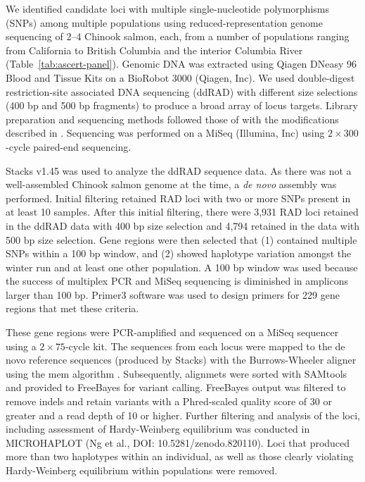 We identified candidate loci with multiple single-nucleotide polymorphisms (SNPs) among multiple
populations using reduced-representation genome sequencing of 2--4 Chinook salmon, each, from a number of
populations ranging from California to British
Columbia and the interior Columbia River (Table~\ref{tab:ascert-panel}).
Genomic DNA was extracted using Qiagen DNeasy 96 Blood and Tissue Kits on a BioRobot 3000
(Qiagen, Inc). We used double-digest restriction-site associated DNA sequencing (ddRAD) with different size selections (400 bp and 500 bp
fragments) to produce a broad array of locus targets. Library preparation and sequencing methods followed those of
\citet{peterson2012double} with the modifications described in \citep{baetscher2018microhaplotypes}.
Sequencing was performed on a MiSeq (Illumina, Inc) using $2 \times 300$-cycle paired-end sequencing.

Stacks v1.45 \cite{catchen2013stacks} was used to analyze the ddRAD sequence data.  As there was not a well-assembled Chinook salmon genome
at the time, a {\em de novo} assembly was performed.  Initial filtering retained RAD loci with two or more SNPs present
in at least 10 samples. After this initial filtering, there were 3,931 RAD loci retained in the ddRAD data with 400 bp size selection and
4,794 retained in the data with 500 bp size selection.
Gene regions were then selected that (1) contained multiple SNPs within a 100 bp window, and (2) showed haplotype variation amongst the winter run and at least one other population.
A 100 bp window was used because the success of multiplex PCR and MiSeq sequencing is diminished in amplicons larger than 100 bp. Primer3
software \citep{untergasser2012primer3} was used to design primers for 229 gene regions that met these criteria.

These gene regions were PCR-amplified and sequenced on a MiSeq sequencer using a $2\times 75$-cycle kit.
The sequences from each locus were mapped to the de novo reference sequences (produced by Stacks) with
the Burrows-Wheeler aligner using the mem algorithm \citep{bwa-mem2009}. 
Subsequently, alignmets were sorted with SAMtools \citep{li2009sequence} and provided to
FreeBayes \citep{garrison2012haplotype} for variant calling.
FreeBayes output was filtered to remove indels and retain variants with a Phred-scaled quality score of 30
or greater and a read depth of 10 or higher. Further filtering and analysis of the loci, including
assessment of Hardy-Weinberg equilibrium \citep{hardy1908mendelian} was conducted in MICROHAPLOT (Ng et al., DOI: 10.5281/zenodo.820110).  Loci that produced more than two haplotypes within an individual, as well as those clearly violating Hardy-Weinberg equilibrium within populations were removed.


